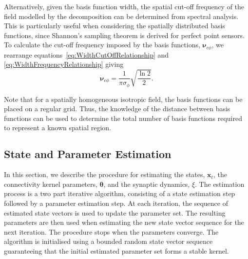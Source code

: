 \documentclass[10pt]{article}
\begin{document}
Alternatively, given the basis function width, the spatial cut-off frequency of the field modelled by the decomposition can be determined from spectral analysis. This is particularly useful when considering the spatially distributed basis functions, since Shannon's sampling theorem is derived for perfect point sensors. To calculate the cut-off frequency imposed by the basis functions, $\boldsymbol{\nu}_{c\phi}$, we rearrange equations~\ref{eq:WidthCutOffRelationship} and \ref{eq:WidthFrequencyRelationship} giving
\begin{equation}\label{eq:CutoffFromBasisFuncWidth}
	\boldsymbol{\nu}_{c\phi}=\frac{1}{\pi\sigma_{\phi}}\sqrt{\frac{\ln2}{2}}.
\end{equation} 

Note that for a spatially homogeneous isotropic field, the basis functions can be placed on a regular grid. Thus, the knowledge of the distance between basis functions can be used to determine the total number of basis functions required to represent a known spatial region.

\subsection{State and Parameter Estimation}\label{StateAndParameterEstimationSection} In this section, we describe the procedure for estimating the states, $\mathbf{x}_t$, the connectivity kernel parameters, $\boldsymbol \theta$, and the synaptic dynamics, $\xi$. The estimation process is a two part iterative algorithm, consisting of a state estimation step followed by a parameter estimation step. At each iteration, the sequence of estimated state vectors is used to update the parameter set. The resulting parameters are then used when estimating the new state vector sequence for the next iteration. The procedure stops when the parameters converge. The algorithm is initialised using a bounded random state vector sequence guaranteeing that the initial estimated parameter set forms a stable kernel.
\end{document}
